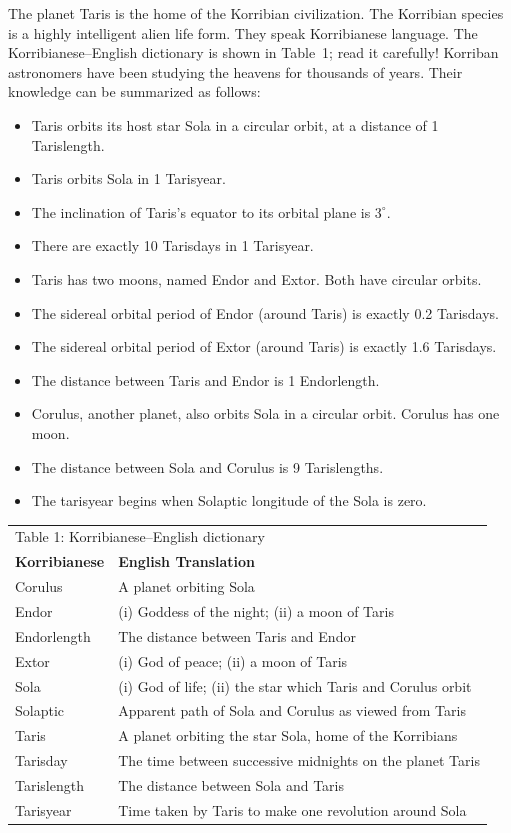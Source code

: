 The planet Taris is the home of the Korribian civilization. The Korribian
species is a highly intelligent alien life form. They speak Korribianese
language. The Korribianese--English dictionary is shown in Table~1; read it
carefully! Korriban astronomers have been studying the heavens for thousands of
years. Their knowledge can be summarized as follows:

\begin{itemize}
\item Taris orbits its host star Sola in a circular orbit, at a distance of
  1 Tarislength.
\item Taris orbits Sola in 1 Tarisyear.
\item The inclination of Taris's equator to its orbital plane is $3^\circ$.
\item There are exactly 10 Tarisdays in 1 Tarisyear.
\item Taris has two moons, named Endor and Extor. Both have circular orbits.
\item The sidereal orbital period of Endor (around Taris) is exactly
  0.2 Tarisdays.
\item The sidereal orbital period of Extor (around Taris) is exactly
  1.6 Tarisdays.
\item The distance between Taris and Endor is 1 Endorlength.
\item Corulus, another planet, also orbits Sola in a circular orbit. Corulus
  has one moon.
\item The distance between Sola and Corulus is 9 Tarislengths.
\item The tarisyear begins when Solaptic longitude of the Sola is zero.
\end{itemize}

\begin{center}
\begin{tabular}{ll}
\multicolumn{2}{l}{Table 1: Korribianese--English dictionary}\\[4pt]
\textbf{Korribianese} & \textbf{English Translation}\\
Corulus & A planet orbiting Sola\\
Endor & (i) Goddess of the night; (ii) a moon of Taris\\
Endorlength & The distance between Taris and Endor\\
Extor & (i) God of peace; (ii) a moon of Taris\\
Sola & (i) God of life; (ii) the star which Taris and Corulus orbit\\
Solaptic & Apparent path of Sola and Corulus as viewed from Taris\\
Taris & A planet orbiting the star Sola, home of the Korribians\\
Tarisday & The time between successive midnights on the planet Taris\\
Tarislength & The distance between Sola and Taris\\
Tarisyear & Time taken by Taris to make one revolution around Sola\\
\end{tabular}
\end{center}

